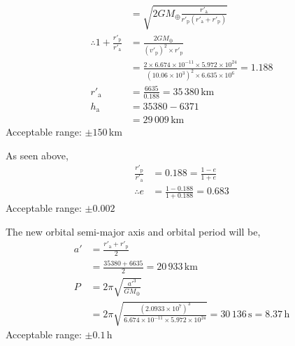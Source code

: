\begin{description}
\begin{align*}
  &= \sqrt{2GM_\oplus \frac{r'_{\mathrm{a}}}
     {r'_{\mathrm{p}}(r'_{\mathrm{a}} + r'_{\mathrm{p}})}} \\
\therefore 1 + \frac{r'_{\mathrm{p}}}{r'_{\mathrm{a}}}
  &= \frac{2GM_\oplus}{(v'_{\mathrm{p}})^2 \times r'_{\mathrm{p}}} \\
  &= \frac{2 \times 6.674 \times 10^{-11} \times 5.972 \times 10^{24}}
     {(10.06 \times 10^{3})^2 \times 6.635 \times 10^{6}} = 1.188 \\
r'_{\mathrm{a}} &= \frac{6635}{0.188} = 35\,380\,\mathrm{km} \\
h_{\mathrm{a}} &= 35380 - 6371 \\
  &= \boxed{29\,009\,\mathrm{km}}
\end{align*}
Acceptable range: $\pm 150$\,km

\item[(T9.2)]
As seen above,
\begin{align*}
\frac{r'_{\mathrm{p}}}{r'_{\mathrm{a}}} &= 0.188 = \frac{1-e}{1+e} \\
\therefore e &= \frac{1 - 0.188}{1 + 0.188} = \boxed{0.683}
\end{align*}
Acceptable range: $\pm 0.002$

The new orbital semi-major axis and orbital period will be,
\begin{align*}
a' &= \frac{r'_{\mathrm{a}} + r'_{\mathrm{p}}}{2} \\
   &= \frac{35380 + 6635}{2} = 20\,933\,\mathrm{km} \\
P &= 2\pi\sqrt{\frac{a'^3}{GM_\oplus}} \\
  &= 2\pi\sqrt{\frac{(2.0933 \times 10^{7})^3}
     {6.674 \times 10^{-11} \times 5.972 \times 10^{24}}}
   = \boxed{30\,136\,\mathrm{s} = 8.37\,\mathrm{h}}
\end{align*}
Acceptable range: $\pm 0.1$\,h
\end{description}

